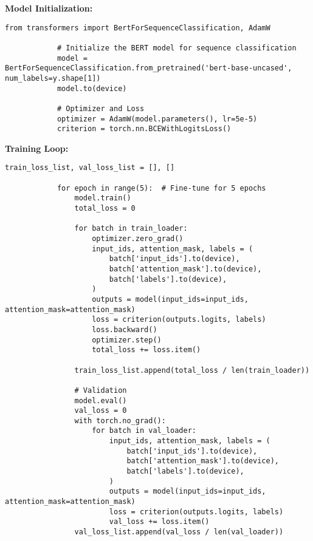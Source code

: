         \vspace{1em}

        \textbf{Model Initialization:}

        \begin{lstlisting}[caption={Initialize BERT model for sequence classification}, label={lst:bert_model}]
            from transformers import BertForSequenceClassification, AdamW

            # Initialize the BERT model for sequence classification
            model = BertForSequenceClassification.from_pretrained('bert-base-uncased', num_labels=y.shape[1])
            model.to(device)

            # Optimizer and Loss
            optimizer = AdamW(model.parameters(), lr=5e-5)
            criterion = torch.nn.BCEWithLogitsLoss()
        \end{lstlisting}
        
        \vspace{1em}

        \textbf{Training Loop:}

        \begin{lstlisting}[caption={Fine-tune BERT model}, label={lst:bert_fine_tune}]
            train_loss_list, val_loss_list = [], []

            for epoch in range(5):  # Fine-tune for 5 epochs
                model.train()
                total_loss = 0

                for batch in train_loader:
                    optimizer.zero_grad()
                    input_ids, attention_mask, labels = (
                        batch['input_ids'].to(device),
                        batch['attention_mask'].to(device),
                        batch['labels'].to(device),
                    )
                    outputs = model(input_ids=input_ids, attention_mask=attention_mask)
                    loss = criterion(outputs.logits, labels)
                    loss.backward()
                    optimizer.step()
                    total_loss += loss.item()

                train_loss_list.append(total_loss / len(train_loader))

                # Validation
                model.eval()
                val_loss = 0
                with torch.no_grad():
                    for batch in val_loader:
                        input_ids, attention_mask, labels = (
                            batch['input_ids'].to(device),
                            batch['attention_mask'].to(device),
                            batch['labels'].to(device),
                        )
                        outputs = model(input_ids=input_ids, attention_mask=attention_mask)
                        loss = criterion(outputs.logits, labels)
                        val_loss += loss.item()
                val_loss_list.append(val_loss / len(val_loader))
        \end{lstlisting}
        
